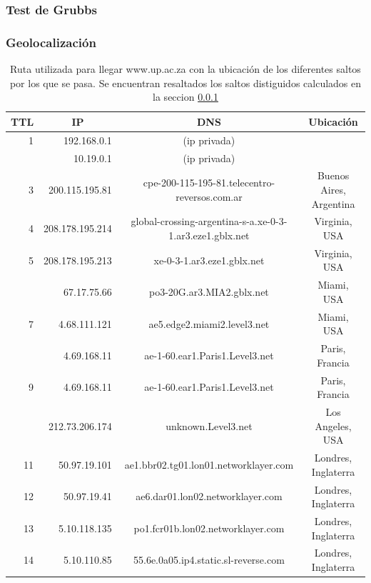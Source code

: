\subsubsection{Test de Grubbs}\label{pretoria:grubbs}

\subsubsection{Geolocalización}

\begin{table}[H]
    \begin{center}
        \begin{tabular}{| r | r | c | c |}
  \hline
  {\bf TTL} & \multicolumn{1}{|c|}{\bf IP} & {\bf DNS} & {\bf Ubicación}\\
  \hline
\hline 1  & 192.168.0.1 & (ip privada) & \\
\rowcolor{blue!25}\hline 2  & 10.19.0.1 & (ip privada) & \\
\hline 3  & 200.115.195.81 & cpe-200-115-195-81.telecentro-reversos.com.ar & Buenos Aires, Argentina\\
\hline 4  & 208.178.195.214 & global-crossing-argentina-s-a.xe-0-3-1.ar3.eze1.gblx.net & Virginia, USA\\ 
\hline 5  & 208.178.195.213 & xe-0-3-1.ar3.eze1.gblx.net & Virginia, USA\\ 
\rowcolor{blue!25}\hline 6  & 67.17.75.66 &  po3-20G.ar3.MIA2.gblx.net & Miami, USA\\ 
\hline 7  & 4.68.111.121 &  ae5.edge2.miami2.level3.net  & Miami, USA\\ 
\rowcolor{blue!25}\hline 8  & 4.69.168.11 & ae-1-60.ear1.Paris1.Level3.net & Paris, Francia\\ 
\hline 9  & 4.69.168.11 & ae-1-60.ear1.Paris1.Level3.net & Paris, Francia\\ 
\rowcolor{blue!25}\hline 10  & 212.73.206.174 & unknown.Level3.net & Los Angeles, USA\\ 
\hline 11  & 50.97.19.101 & ae1.bbr02.tg01.lon01.networklayer.com & Londres, Inglaterra\\ 
\hline 12  & 50.97.19.41 & ae6.dar01.lon02.networklayer.com & Londres, Inglaterra\\ 
\hline 13  & 5.10.118.135 & po1.fcr01b.lon02.networklayer.com & Londres, Inglaterra\\ 
\hline 14  & 5.10.110.85 &  55.6e.0a05.ip4.static.sl-reverse.com & Londres, Inglaterra\\ 
\hline
        \end{tabular}
        \caption{Ruta utilizada para llegar www.up.ac.za con la ubicación de los diferentes saltos por los que se pasa. Se encuentran resaltados los saltos distiguidos calculados en la seccion \ref{pretoria:grubbs}}
        \label{table:pretoria} 
    \end{center}
\end{table}
